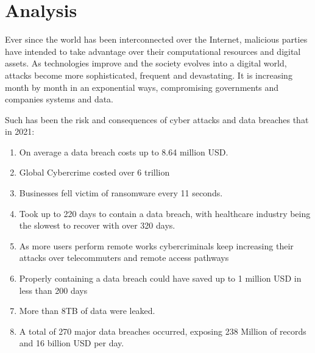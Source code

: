 \section{Analysis}

Ever since the world has been interconnected over the Internet, malicious parties have intended to take advantage over their computational resources and digital assets. As technologies improve and the society evolves into a digital world, attacks become more sophisticated, frequent and devastating. It is increasing month by month in an exponential ways, compromising governments and companies systems and data. 

Such has been the risk and consequences of cyber attacks and data breaches that in 2021\cite{10DataBreaches:online}:
\begin{enumerate}
    \item On average a data breach costs up to 8.64 million \ac{USD}.
    \item Global Cybercrime costed over 6 trillion
    \item Businesses fell victim of ransomware every 11 seconds.
    \item Took up to 220 days to contain a data breach, with healthcare industry being the slowest to recover with over 320 days.
    \item  As more users perform remote works cybercriminals keep increasing their attacks over telecommuters and remote access pathways
    \item Properly containing a data breach could have saved up to 1 million \ac{USD} in less than 200 days
    \item More than 8\ac{TB} of data were leaked.
    \item A total of 270 major data breaches occurred, exposing 238 Million of records and 16 billion \ac{USD} per day.
\end{enumerate}

